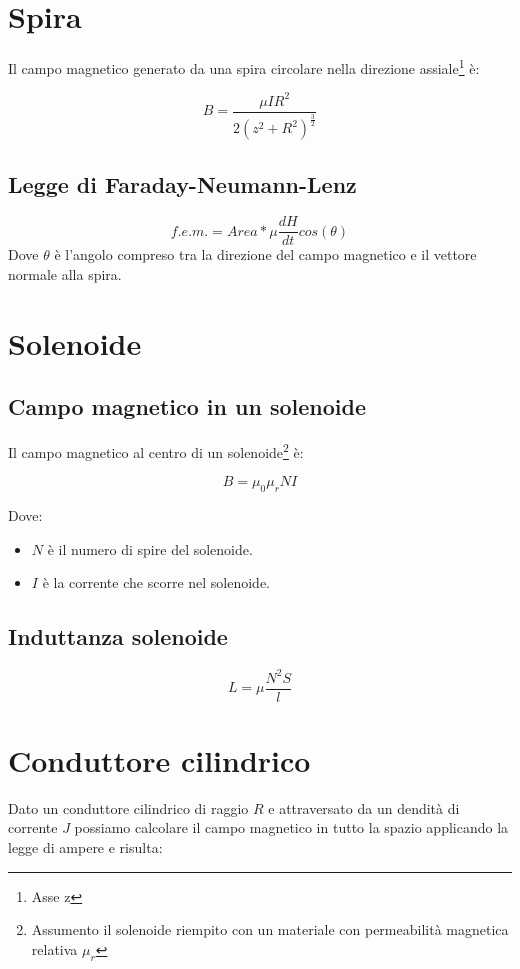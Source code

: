 \documentclass[10pt,a4paper]{report}
\begin{document}
	\section{Spira}
			Il campo magnetico generato da una spira circolare nella direzione assiale\footnote{Asse z} è:

			\begin{equation}
			B=\frac{\mu IR^2}{2(z^2+R^2)^{\frac{3}{2}}}
			\end{equation}

		\subsection{Legge di Faraday-Neumann-Lenz}

		\[
		f.e.m.=Area* \mu \frac{dH}{dt} cos(\theta) 
		\]
		Dove $\theta$ è l'angolo compreso tra la direzione del campo magnetico e il vettore normale alla spira.
	\section{Solenoide}
		\subsection{Campo magnetico in un solenoide}
			Il campo magnetico al centro di un solenoide\footnote{Assumento il solenoide riempito con un materiale con permeabilità magnetica relativa $\mu_r$} è:

			\begin{equation}
			B=\mu_0\mu_rNI
			\end{equation}

			Dove:

			\begin{itemize}
			\item $N$ è il numero di spire del solenoide.
			\item $I$ è la corrente che scorre nel solenoide.
			\end{itemize}

		\subsection{Induttanza solenoide}
				\begin{equation} 
				L=\mu \frac{N^2S}{l}
				\label{eq:induttanza-solenoide}
				\end{equation}

	\section{Conduttore cilindrico}
		Dato un conduttore cilindrico di raggio $R$ e attraversato da un dendità di corrente $J$ possiamo calcolare il campo magnetico in tutto la spazio applicando la legge di ampere e risulta:
\end{document}
